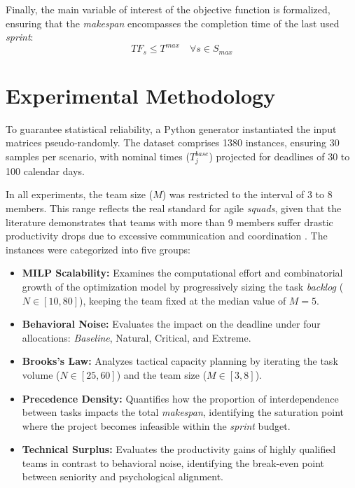 \documentclass[a4paper,11pt]{article}
\begin{document}
Finally, the main variable of interest of the objective function is formalized, 
ensuring that the \textit{makespan} encompasses the completion time of the 
last used \textit{sprint}:
\begin{equation}
    TF_s \le T^{max} \quad \forall s \in S_{max}
\end{equation}

\section{Experimental Methodology}

To guarantee statistical reliability, a Python generator instantiated the input 
matrices pseudo-randomly. The dataset comprises 1380 instances, ensuring 30 
samples per scenario, with nominal times ($T^{base}_j$) projected for deadlines 
of 30 to 100 calendar days. 

In all experiments, the team size ($M$) was restricted to the interval of 3 
to 8 members. This range reflects the real standard for agile \textit{squads}, 
given that the literature demonstrates that teams with more than 9 members 
suffer drastic productivity drops due to excessive communication and 
coordination \cite{kniberg2012, schwaber2017}. The instances were categorized 
into five groups:

\begin{itemize}
    \item \textbf{MILP Scalability:} Examines the computational effort and 
    combinatorial growth of the optimization model by progressively sizing the 
    task \textit{backlog} ($N \in [10, 80]$), keeping the team fixed at the 
    median value of $M = 5$.
    
    \item \textbf{Behavioral Noise:} Evaluates the impact on the deadline under 
    four allocations: \textit{Baseline}, Natural, Critical, and Extreme.
    
    \item \textbf{Brooks's Law:} Analyzes tactical capacity planning by 
    iterating the task volume ($N \in [25, 60]$) and the team size 
    ($M \in [3, 8]$).

    \item \textbf{Precedence Density:} Quantifies how the proportion of 
    interdependence between tasks impacts the total \textit{makespan}, 
    identifying the saturation point where the project becomes infeasible 
    within the \textit{sprint} budget.

    \item \textbf{Technical Surplus:} Evaluates the productivity gains of 
    highly qualified teams in contrast to behavioral noise, identifying the 
    break-even point between seniority and psychological alignment.
\end{itemize}
\end{document}
